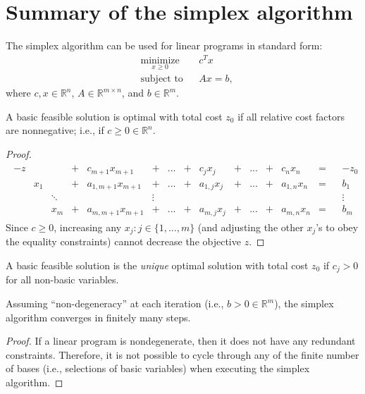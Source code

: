 \section{Summary of the simplex algorithm}

The simplex algorithm can be used for linear programs in standard form:
\begin{equation}
\begin{aligned}
& \underset{x \geq 0}{\text{minimize}}
& & c^Tx \\
& \text{subject to}
& & Ax = b,
\end{aligned}
\label{eqn:lp_stdform}
\end{equation}
where $c,x\in\mathbb{R}^n$, $A\in\mathbb{R}^{m \times n}$, and $b\in\mathbb{R}^m$.


\begin{theorem}
A basic feasible solution is optimal with total cost $z_0$ if all relative cost factors are nonnegative; i.e., if $c \geq 0 \in\mathbb{R}^n$.
\end{theorem}
\begin{proof}
\begin{eqnarray}
\begin{aligned}
-z & & &+& c_{m+1}x_{m+1} &+& ... &+& c_jx_j &+& ... &+& c_nx_n &=& &-z_0& \\
& x_1 & &+& a_{1,m+1}x_{m+1} &+& ... &+& a_{1,j}x_j &+& ... &+& a_{1,n}x_n &=& &b_1& \\
& & \ddots & & & \vdots & & & & & & & & & & \vdots\\
& & x_m &+& a_{m,m+1}x_{m+1} &+& ... &+& a_{m,j}x_j &+& ... &+& a_{m,n}x_n &=& &b_m&
\end{aligned}
\end{eqnarray}
Since $c \geq 0$, increasing any $x_j: j\in\lbrace 1,...,m \rbrace$ (and adjusting the other $x_j$'s to obey the equality constraints) cannot decrease the objective $z$.
\end{proof}
\begin{theorem}
A basic feasible solution is the \emph{unique} optimal solution with total cost $z_0$ if $c_j > 0$ for all non-basic variables.
\end{theorem}
\begin{theorem}
Assuming ``non-degeneracy'' at each iteration (i.e., $b > 0 \in\mathbb{R}^m$), the simplex algorithm converges in finitely many steps.
\end{theorem}
\begin{proof}
If a linear program is nondegenerate, then it does not have any redundant constraints. Therefore, it is not possible to cycle through any of the finite number of bases (i.e., selections of basic variables) when executing the simplex algorithm.
\end{proof}

